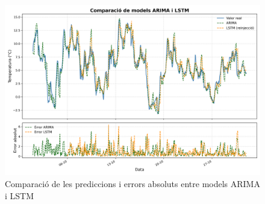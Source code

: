 \documentclass[../main.tex]{subfiles}
\begin{document}
\begin{figure}[H]
    \centering
    \includegraphics[width=0.75\linewidth]{figures/comp_arima_lstm/comparacio_models_amb_errors.png}
    \caption{Comparació de les prediccions i errors absoluts entre models ARIMA i LSTM }
    \label{fig:comp_arima_lstm}
\end{figure}


\end{document}
